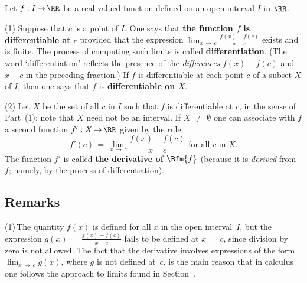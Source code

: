         Let $f:I \,{\rightarrow}\, {\RR}$ be a real-valued function defined on an open interval $I$ in ${\RR}$.

\V

        (1) Suppose that $c$ is a point of $I$. One says that {\bf the function $f$ is {\bf differentiable} at $c$}
    provided that the expression ${\displaystyle \lim_{x \,{\rightarrow}\, c} \frac{f(x)-f(c)}{x-c}}$ exists and is finite.
    The process of computing such limits is called {\bf differentiation}.
    (The word `differentiation' reflects the presence of the {\em differences} $f(x)-f(c)$ and $x-c$ in the preceding fraction.)
    If $f$ is differentiable at each point $c$ of a subset $X$ of $I$, then one says that $f$ is {\bf differentiable on $X$}. 

\V

        (2) Let $X$ be the set of all $c$ in $I$ such that $f$ is differentiable at $c$, in the sense of Part~(1); note that $X$ need not be an interval.
    If $X \,\,{\neq}\,\, {\emptyset}$ one can associate with $f$ a second function $f':X \,{\rightarrow}\, {\RR}$ given by the rule
        \begin{equation}
        \label{LimE.10}
        f'(c) \,=\, \lim_{x \,{\rightarrow}\, c} \frac{f(x)-f(c)}{x-c} \mbox{ for all $c$ in $X$}.
        \end{equation}
    The function $f'$ is called {\bf the derivative of $\Bfm{f}$}
    (because it is {\em derived} from $f$; namely, by the process of differentiation).

\VV

            \subsection{\small{\bf Remarks}}
            \label{RemrkE20.20}

\hspace*{\parindent} (1)\,The quantity $f(x)$ is defined for all $x$ in the open interval~$I$,
    but the expression ${\displaystyle g(x) \,=\, \frac{f(x)-f(c)}{x-c}}$ fails to be defined at $x \,=\, c$, since division by zero is not allowed.
    The fact that the derivative involves expressions of the form $\lim_{x \,{\rightarrow}\, c} g(x)$, where $g$ is not defined at~$c$,
    is the main reason that in calculus one follows the approach to limits found in Section~.

